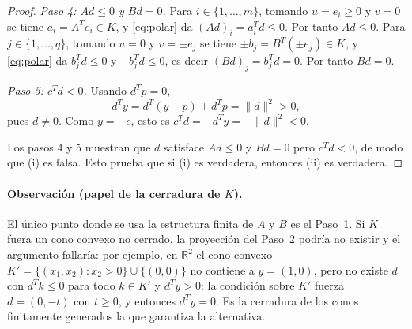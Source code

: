 \documentclass[11pt]{article}
\begin{document}
\begin{proof}
\emph{Paso 4: $Ad\le 0$ y $Bd=0$.}
Para $i\in\{1,\dots,m\}$, tomando $u=e_i\ge 0$ y $v=0$ se tiene $a_i=A^Te_i\in K$, y \eqref{eq:polar} da $(Ad)_i=a_i^Td\le 0$. Por tanto $Ad\le 0$.
Para $j\in\{1,\dots,q\}$, tomando $u=0$ y $v=\pm e_j$ se tiene $\pm b_j=B^T(\pm e_j)\in K$, y \eqref{eq:polar} da $b_j^Td\le 0$ y $-b_j^Td\le 0$, es decir $(Bd)_j=b_j^Td=0$. Por tanto $Bd=0$.

\emph{Paso 5: $c^Td<0$.}
Usando $d^Tp=0$,
\[
d^Ty=d^T(y-p)+d^Tp=\|d\|^2>0,
\]
pues $d\neq 0$. Como $y=-c$, esto es $c^Td=-d^Ty=-\|d\|^2<0$.

Los pasos 4 y 5 muestran que $d$ satisface $Ad\le 0$ y $Bd=0$ pero $c^Td<0$, de modo que (i) es falsa. Esto prueba que si (i) es verdadera, entonces (ii) es verdadera.
\end{proof}

\paragraph{Observación (papel de la cerradura de $K$).}
El único punto donde se usa la estructura finita de $A$ y $B$ es el Paso~1. Si $K$ fuera un cono convexo no cerrado, la proyección del Paso~2 podría no existir y el argumento fallaría: por ejemplo, en $\mathbb{R}^2$ el cono convexo $K'=\{(x_1,x_2): x_2>0\}\cup\{(0,0)\}$ no contiene a $y=(1,0)$, pero no existe $d$ con $d^Tk\le 0$ para todo $k\in K'$ y $d^Ty>0$: la condición sobre $K'$ fuerza $d=(0,-t)$ con $t\ge 0$, y entonces $d^Ty=0$. Es la cerradura de los conos finitamente generados la que garantiza la alternativa.
\end{document}
